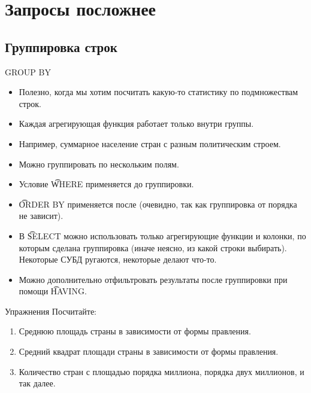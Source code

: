 \section{Запросы посложнее}
\begin{frame}
	\tableofcontents[currentsection]
\end{frame}

\subsection{Группировка строк}

\begin{frame}{GROUP BY}
	\begin{itemize}
		\item Полезно, когда мы хотим посчитать какую-то статистику по подмножествам строк.
		\item Каждая агрегирующая функция работает только внутри группы.
		\item Например, суммарное население стран с разным политическим строем.
		\item Можно группировать по нескольким полям.
		\item Условие \t{WHERE} применяется до группировки.
		\item \t{ORDER BY} применяется после (очевидно, так как группировка от порядка не зависит).
		\item В \t{SELECT} можно использовать только агрегирующие функции и колонки, по которым сделана группировка
			(иначе неясно, из какой строки выбирать).
			Некоторые СУБД ругаются, некоторые делают что-то.
		\item Можно дополнительно отфильтровать результаты после группировки при помощи \t{HAVING}.
	\end{itemize}
\end{frame}

\begin{frame}{Упражнения}
	Посчитайте:
	\begin{enumerate}
		\item Среднюю площадь страны в зависимости от формы правления.
		\item Средний квадрат площади страны в зависимости от формы правления.
		\item Количество стран с площадью порядка миллиона, порядка двух миллионов, и так далее.
	\end{enumerate}
\end{frame}

